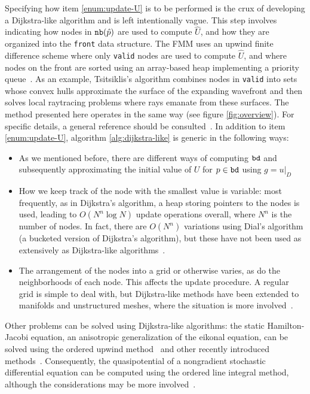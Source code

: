 \documentclass[smallcondensed]{svjour3}
\begin{document}
Specifying how item \ref{enum:update-U} is to be performed is the crux
of developing a Dijkstra-like algorithm and is left intentionally
vague. This step involves indicating how nodes in $\texttt{nb}(\hat{p})$ are
used to compute $\hat{U}$, and how they are organized into the
\texttt{front} data structure. The FMM uses an upwind finite
difference scheme where only \texttt{valid} nodes are used to compute
$\hat{U}$, and where nodes on the front are sorted using an
array-based heap implementing a priority
queue~\cite{sethian1996fast}. As an example, Tsitsiklis's algorithm
combines nodes in \texttt{valid} into sets whose convex hulls
approximate the surface of the expanding wavefront and then solves
local raytracing problems where rays emanate from these surfaces. The
method presented here operates in the same way (see figure
\ref{fig:overview}). For specific details, a general reference should
be consulted~\cite{sethian1999level}. In addition to item
\ref{enum:update-U}, algorithm \ref{alg:dijkstra-like} is generic in
the following ways:
\begin{itemize}
\item As we mentioned before, there are different ways of computing
  $\texttt{bd}$ and subsequently approximating the initial value of $U$
  for $p \in \texttt{bd}$ using
  $g = \left. u \right|_D$~\cite{chopp2001some}
\item How we keep track of the node with the smallest value is
  variable: most frequently, as in Dijkstra's algorithm, a heap
  storing pointers to the nodes is used, leading to $O(N^n \log N)$
  update operations overall, where $N^n$ is the number of nodes. In
  fact, there are $O(N^n)$ variations using Dial's algorithm (a
  bucketed version of Dijkstra's algorithm), but these have not been
  used as extensively as Dijkstra-like
  algorithms~\cite{tsitsiklis1995efficient,kim2001calo,yatziv2006n}.
\item The arrangement of the nodes into a grid or otherwise varies, as
  do the neighborhoods of each node. This affects the update
  procedure. A regular grid is simple to deal with, but Dijkstra-like
  methods have been extended to manifolds and unstructured meshes,
  where the situation is more
  involved~\cite{kimmel1998computing,sethian2000fast,bronstein2008numerical}.
\end{itemize}
Other problems can be solved using Dijkstra-like algorithms: the
static Hamilton-Jacobi equation, an anisotropic generalization of the
eikonal equation, can be solved using the ordered upwind
method~\cite{sethian2003ordered} and other recently introduced
methods~\cite{mirebeau2014efficient,mirebeau2014anisotropic}. Consequently,
the quasipotential of a nongradient stochastic differential equation
can be computed using the ordered line integral method, although the
considerations may be more
involved~\cite{dahiya2017ordered,dahiya2018ordered,yang2019computing}.
\end{document}
